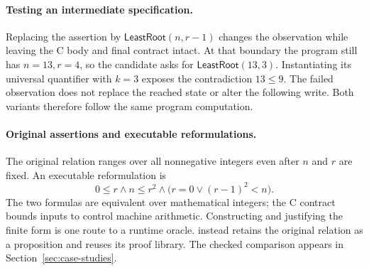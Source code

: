 \paragraph{Testing an intermediate specification.}
Replacing the assertion by $\mathsf{LeastRoot}(n,r-1)$ changes the observation
while leaving the C body and final contract intact. At that boundary the
program still has $n=13,r=4$, so the candidate asks for
$\mathsf{LeastRoot}(13,3)$. Instantiating its universal quantifier with $k=3$
exposes the contradiction $13\le9$. The failed observation does not replace the reached state or alter the
following write. Both variants therefore follow the same program computation.

\paragraph{Original assertions and executable reformulations.}
The original relation ranges over all nonnegative integers even after
$n$ and $r$ are fixed. An executable reformulation is
\begin{equation}
\label{eq:finite-root}
0\le r\land n\le r^2\land
   \bigl(r=0\lor(r-1)^2<n\bigr).
\end{equation}
The two formulas are equivalent over mathematical integers; the C contract
bounds inputs to control machine arithmetic. Constructing and justifying the
finite form is one route to a runtime oracle. \tespec{} instead retains the
original relation as a proposition and reuses its proof library. The checked
comparison appears in Section~\ref{sec:case-studies}.


